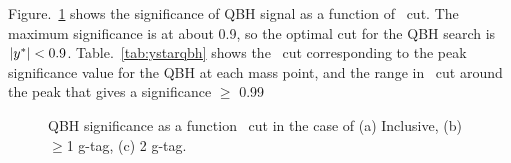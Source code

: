 Figure.~\ref{fig: qbh significance as a function of y* cut} shows the significance of QBH signal as a function of \ystar\ cut. The maximum significance is at about 0.9, so the optimal cut for the QBH search is $|y^\ast| < 0.9$. Table.~\ref{tab:ystarqbh} shows the \ystar\ cut corresponding to the peak significance value for the QBH at each mass point, and the range in \ystar\ cut around the peak that gives a significance $\geq$ 0.99
\begin{figure}[!htb]
        \centering
        \caption{QBH significance as a function \ystar\ cut in the case of (a) Inclusive, (b) $\geq$1 g-tag, (c) 2 g-tag.}
        \label{fig: qbh significance as a function of y* cut}
\end{figure}


